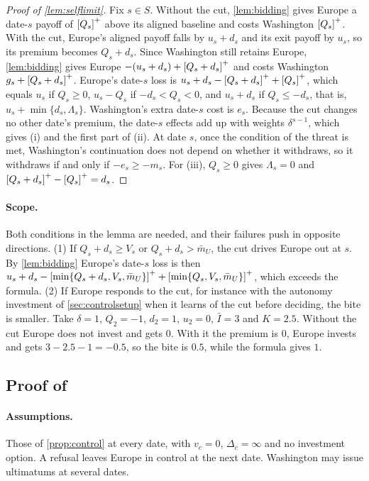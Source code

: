 \begin{proof}[Proof of \cref{lem:selflimit}]
Fix $s\in S$. Without the cut, \cref{lem:bidding} gives Europe a date-$s$ payoff of $\left[Q_s\right]^{+}$ above its aligned baseline and costs Washington $\left[Q_s\right]^{+}$. With the cut, Europe's aligned payoff falls by $u_s+d_s$ and its exit payoff by $u_s$, so its premium becomes $Q_s+d_s$. Since Washington still retains Europe, \cref{lem:bidding} gives Europe $-(u_s+d_s)+\left[Q_s+d_s\right]^{+}$ and costs Washington $g_s+\left[Q_s+d_s\right]^{+}$. Europe's date-$s$ loss is $u_s+d_s-\left[Q_s+d_s\right]^{+}+\left[Q_s\right]^{+}$, which equals $u_s$ if $Q_s\ge 0$, $u_s-Q_s$ if $-d_s<Q_s<0$, and $u_s+d_s$ if $Q_s\le -d_s$, that is, $u_s+\min\{d_s,\Lambda_s\}$. Washington's extra date-$s$ cost is $e_s$. Because the cut changes no other date's premium, the date-$s$ effects add up with weights $\delta^{s-1}$, which gives (i) and the first part of (ii). At date $s$, once the condition of the threat is met, Washington's continuation does not depend on whether it withdraws, so it withdraws if and only if $-e_s\ge-m_s$. For (iii), $Q_s\ge 0$ gives $\Lambda_s=0$ and $\left[Q_s+d_s\right]^{+}-\left[Q_s\right]^{+}=d_s$.
\end{proof}

\paragraph{Scope.} Both conditions in the lemma are needed, and their failures push in opposite directions. (1) If $Q_s+d_s\ge V_s$ or $Q_s+d_s>\bar m_U$, the cut drives Europe out at $s$. By \cref{lem:bidding} Europe's date-$s$ loss is then $u_s+d_s-\left[\min\{Q_s+d_s,V_s,\bar m_U\}\right]^{+}+\left[\min\{Q_s,V_s,\bar m_U\}\right]^{+}$, which exceeds the formula. (2) If Europe responds to the cut, for instance with the autonomy investment of \cref{sec:controlsetup} when it learns of the cut before deciding, the bite is smaller. Take $\delta=1$, $Q_2=-1$, $d_2=1$, $u_2=0$, $\bar I=3$ and $K=2.5$. Without the cut Europe does not invest and gets $0$. With it the premium is $0$, Europe invests and gets $3-2.5-1=-0.5$, so the bite is $0.5$, while the formula gives $1$.

\subsection{Proof of \texorpdfstring{}{windows}}

\paragraph{Assumptions.} Those of \cref{prop:control} at every date, with $v_c=0$, $\Delta_c=\infty$ and no investment option. A refusal leaves Europe in control at the next date. Washington may issue ultimatums at several dates.

